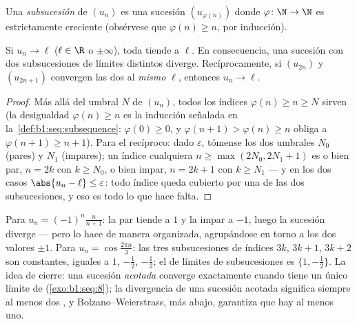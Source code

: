 \begin{definition}[Subsucesión]\label{def:b1:seq:subsequence}
Una \emph{subsucesión} de $(u_n)$ es una sucesión
$(u_{\varphi(n)})$ donde $\varphi \colon \N \to \N$ es estrictamente
creciente (obsérvese que $\varphi(n) \geq n$, por inducción).
\end{definition}

\begin{proposition}\label{prop:b1:seq:subsequences}
Si $u_n \to \ell$ ($\ell \in \R$ o $\pm\infty$), toda 
tiende a $\ell$. En consecuencia, una sucesión con dos subsucesiones
de límites distintos diverge. Recíprocamente, si $(u_{2n})$ y
$(u_{2n+1})$ convergen las dos al \emph{mismo} $\ell$, entonces
$u_n \to \ell$.
\end{proposition}

\begin{proof}
Más allá del umbral $N$ de $(u_n)$, todos los índices
$\varphi(n) \geq n \geq N$ sirven (la desigualdad $\varphi(n) \geq n$
es la inducción señalada en la~\cref{def:b1:seq:subsequence}:
$\varphi(0) \geq 0$, y $\varphi(n+1) > \varphi(n) \geq n$ obliga a
$\varphi(n+1) \geq n + 1$). Para el recíproco: dado $\varepsilon$,
tómense los dos umbrales $N_0$ (pares) y $N_1$ (impares); un índice
cualquiera $n \geq \max(2N_0, 2N_1 + 1)$ es o bien par, $n = 2k$ con
$k \geq N_0$, o bien impar, $n = 2k+1$ con $k \geq N_1$ --- y en los
dos casos $\abs{u_n - \ell} \leq \varepsilon$: todo índice queda
cubierto por una de las dos subsucesiones, y eso es todo lo que
hace falta.
\end{proof}

\begin{example}\label{ex:b1:seq:sublimits}
Para $u_n = (-1)^n \frac{n}{n+1}$: la  par tiende a $1$ y
la impar a $-1$, luego la sucesión diverge --- pero lo hace de manera
organizada, agrupándose en torno a los dos valores $\pm 1$. Para
$u_n = \cos\frac{2\pi n}{3}$: las tres subsucesiones de índices $3k$,
$3k + 1$, $3k + 2$ son constantes, iguales a $1$, $-\frac12$,
$-\frac12$; el  de límites de subsucesiones es
$\{1, -\frac12\}$. La idea de cierre: una sucesión \emph{acotada}
converge exactamente cuando tiene un único límite de 
(\cref{exo:b1:seq:8}); la divergencia de una sucesión acotada
significa siempre al menos dos , y Bolzano--Weierstrass, más
abajo, garantiza que hay al menos uno.
\end{example}

